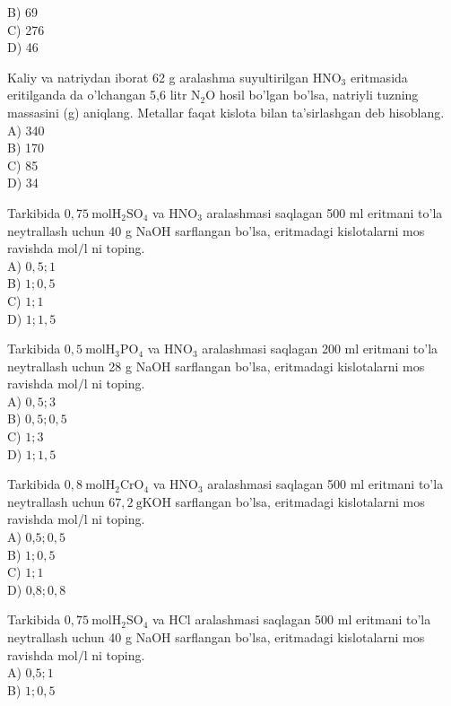 B) 69\\
C) 276\\
D) 46
  \item Kaliy va natriydan iborat 62 g aralashma suyultirilgan $\mathrm{HNO}_{3}$ eritmasida eritilganda da o'lchangan 5,6 litr $\mathrm{N}_{2} \mathrm{O}$ hosil bo'lgan bo'lsa, natriyli tuzning massasini (g) aniqlang. Metallar faqat kislota bilan ta'sirlashgan deb hisoblang.\\
A) 340\\
B) 170\\
C) 85\\
D) 34
  \item Tarkibida $0,75 \mathrm{~mol} \mathrm{H}_{2} \mathrm{SO}_{4}$ va $\mathrm{HNO}_{3}$ aralashmasi saqlagan 500 ml eritmani to'la neytrallash uchun 40 g NaOH sarflangan bo'lsa, eritmadagi kislotalarni mos ravishda $\mathrm{mol} / \mathrm{l}$ ni toping.\\
A) $0,5 ; 1$\\
B) $1 ; 0,5$\\
C) $1 ; 1$\\
D) $1 ; 1,5$
  \item Tarkibida $0,5 \mathrm{~mol} \mathrm{H}_{3} \mathrm{PO}_{4}$ va $\mathrm{HNO}_{3}$ aralashmasi saqlagan 200 ml eritmani to'la neytrallash uchun 28 g NaOH sarflangan bo'lsa, eritmadagi kislotalarni mos ravishda $\mathrm{mol} / \mathrm{l}$ ni toping.\\
A) $0,5 ; 3$\\
B) $0,5 ; 0,5$\\
C) $1 ; 3$\\
D) $1 ; 1,5$
  \item Tarkibida $0,8 \mathrm{~mol} \mathrm{H}_{2} \mathrm{CrO}_{4}$ va $\mathrm{HNO}_{3}$ aralashmasi saqlagan 500 ml eritmani to'la neytrallash uchun $67,2 \mathrm{~g} \mathrm{KOH}$ sarflangan bo'lsa, eritmadagi kislotalarni mos ravishda mol/l ni toping.\\
A) 0,$5 ; 0,5$\\
B) $1 ; 0,5$\\
C) $1 ; 1$\\
D) 0,$8 ; 0,8$
  \item Tarkibida $0,75 \mathrm{~mol} \mathrm{H}_{2} \mathrm{SO}_{4}$ va HCl aralashmasi saqlagan 500 ml eritmani to'la neytrallash uchun 40 g NaOH sarflangan bo'lsa, eritmadagi kislotalarni mos ravishda $\mathrm{mol} / \mathrm{l}$ ni toping.\\
A) 0,$5 ; 1$\\
B) $1 ; 0,5$\\
